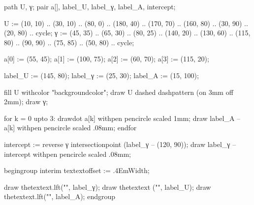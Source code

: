 \startenvironment[images]

\environment[colors]

  path U, γ;
  pair a[], label_U, label_γ, label_A, intercept;

  U := (10, 10) .. (30, 10) .. (80, 0) .. (180, 40) .. (170, 70)
    .. (160, 80) .. (30, 90) .. (20, 80) .. cycle;
  γ := (45, 35) .. (65, 30) .. (80, 25) .. (140, 20) .. (130, 60)
    .. (115, 80) .. (90, 90) .. (75, 85) .. (50, 80) .. cycle;

  a[0] := (55, 45);
  a[1] := (100, 75);
  a[2] := (60, 70);
  a[3] := (115, 20);

  label_U := (145, 80);
  label_γ := (25, 30);
  label_A := (15, 100);

  fill U withcolor "backgroundcolor";
  draw U dashed dashpattern (on 3mm off 2mm);
  draw γ;

  for k = 0 upto 3:
    drawdot a[k] withpen pencircle scaled 1mm;
    draw label_A -- a[k] withpen pencircle scaled .08mm;
  endfor

  intercept := reverse γ intersectionpoint (label_γ -- (120, 90));
  draw label_γ -- intercept withpen pencircle scaled .08mm;

  begingroup
    interim textextoffset := .4EmWidth;

    draw thetextext.lft("", label_γ);
    draw thetextext    ("", label_U);
    draw thetextext.lft("", label_A);
  endgroup
\stopuseMPgraphic

\stopenvironment
